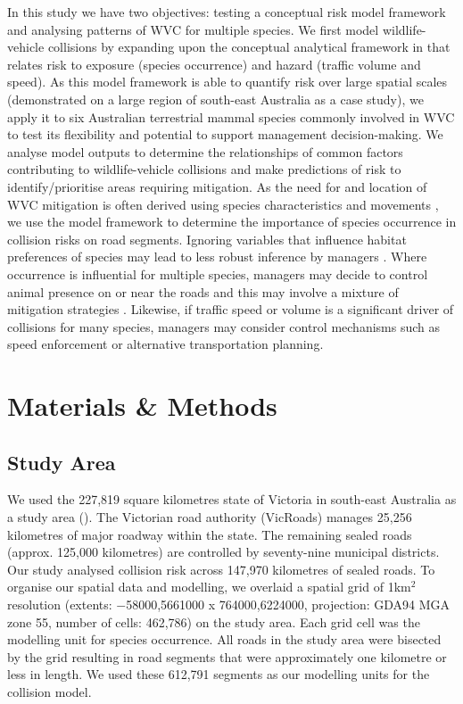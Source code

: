 In this study we have two objectives: testing a conceptual risk model framework and analysing patterns of WVC for multiple species.  We first model wildlife-vehicle collisions by expanding upon the conceptual analytical framework in  that relates risk to exposure (species occurrence) and hazard (traffic volume and speed).  As this model framework is able to quantify risk over large spatial scales (demonstrated on a large region of south-east Australia as a case study), we apply it to six Australian terrestrial mammal species commonly involved in WVC to test its flexibility and potential to support management decision-making.  We analyse model outputs to determine the relationships of common factors contributing to wildlife-vehicle collisions and make predictions of risk to identify/prioritise areas requiring mitigation.  As the need for and location of WVC mitigation is often derived using species characteristics and movements \citep[e.g.][]{clev02}, we use the model framework to determine the importance of species occurrence in collision risks on road segments.  Ignoring variables that influence habitat preferences of species may lead to less robust inference by managers \citep{roge09}.  Where occurrence is influential for multiple species, managers may decide to control animal presence on or near the roads and this may involve a mixture of mitigation strategies \citep[see][]{beck10}.  Likewise, if traffic speed or volume is a significant driver of collisions for many species, managers may consider control mechanisms such as speed enforcement or alternative transportation planning.

\section{Materials \& Methods}

\subsection{Study Area}

We used the 227,819 square kilometres state of Victoria in south-east Australia as a study area (). The Victorian road authority (VicRoads) manages 25,256 kilometres of major roadway within the state. The remaining sealed roads (approx. 125,000 kilometres) are controlled by seventy-nine municipal districts. Our study analysed collision risk across 147,970 kilometres of sealed roads. To organise our spatial data and modelling, we overlaid a spatial grid of 1km$^2$ resolution (extents: $-$58000,5661000 x 764000,6224000, projection: GDA94 MGA zone 55, number of cells: 462,786) on the study area. Each grid cell was the modelling unit for species occurrence. All roads in the study area were bisected by the grid resulting in road segments that were approximately one kilometre or less in length. We used these 612,791 segments as our modelling units for the collision model.

